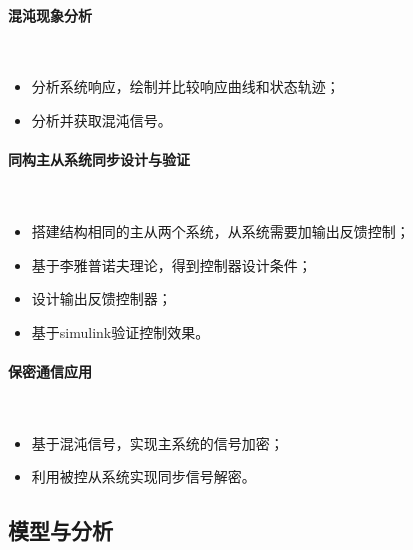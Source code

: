 \documentclass[UTF8]{article}
\begin{document}
\paragraph{混沌现象分析}~{}
\begin{itemize}
	\item 分析系统响应，绘制并比较响应曲线和状态轨迹；
	\item 分析并获取混沌信号。
\end{itemize}

\paragraph{同构主从系统同步设计与验证}~{}
\begin{itemize}
	\item 搭建结构相同的主从两个系统，从系统需要加输出反馈控制；
	\item 基于李雅普诺夫理论，得到控制器设计条件；
	\item 设计输出反馈控制器；
	\item 基于simulink验证控制效果。
\end{itemize}

\paragraph{保密通信应用}~{}
\begin{itemize}
	\item 基于混沌信号，实现主系统的信号加密；
	\item 利用被控从系统实现同步信号解密。
\end{itemize}

\subsection{模型与分析}
\end{document}
